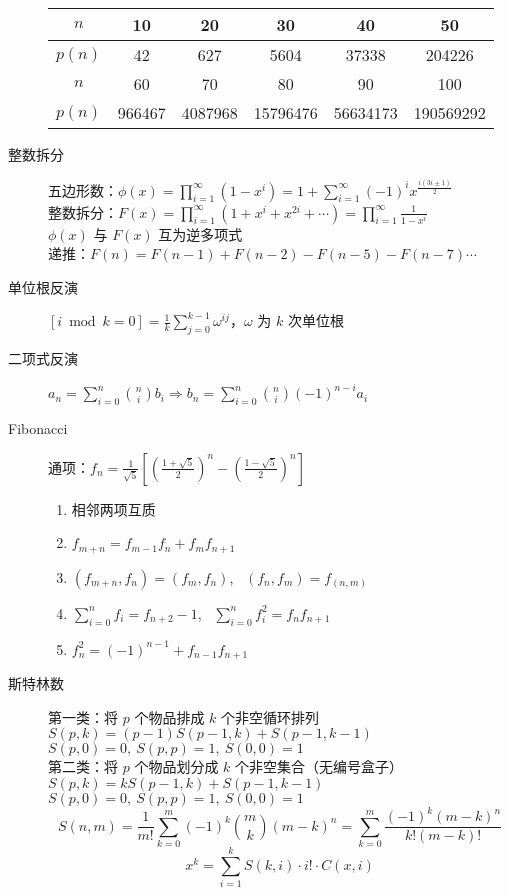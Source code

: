 \documentclass[6pt]{article}
\begin{document}
\begin{multicols}{2}
\begin{description}
          \begin{tabular}{@{}|c|ccccc|}
            \hline
            $n$    & 10     & 20      & 30       & 40       & 50        \\
            \hline
            $p(n)$ & 42     & 627     & 5604     & 37338    & 204226    \\
            \hline
            $n$    & 60     & 70      & 80       & 90       & 100       \\
            \hline
            $p(n)$ & 966467 & 4087968 & 15796476 & 56634173 & 190569292 \\
            \hline
          \end{tabular}
    \item[整数拆分] 五边形数：$\phi(x) = \prod_{i=1}^{\infty} (1-x^i) = 1+ \sum_{i=1}^{\infty} (-1)^i x^{\frac{i(3i\pm 1)}{2}}$ \\
          整数拆分：$F(x) = \prod_{i=1}^{\infty} (1+x^i+x^{2i}+ \cdots) = \prod_{i=1}^{\infty} \frac{1}{1-x^i}$ \\
          $\phi(x)$ 与 $F(x)$ 互为逆多项式 \\
          递推：$F(n) = F(n-1) + F(n-2) - F(n-5) - F(n-7) \cdots$
    \item[单位根反演] $[i \bmod k = 0] = \frac{1}{k} \sum_{j=0}^{k-1} \omega^{ij}$，$\omega$ 为 $k$ 次单位根
    \item[二项式反演] $a_n = \sum_{i=0}^n \binom{n}{i} b_i \Rightarrow b_n = \sum_{i=0}^n \binom{n}{i} (-1)^{n-i} a_i$
    \item[Fibonacci] 通项：$f_n = \frac{1}{\sqrt 5} \left[ \left(\frac{1+\sqrt 5}{2}\right)^n - \left(\frac{1-\sqrt 5}{2}\right)^n \right]$
          \begin{enumerate}
            \item 相邻两项互质
            \item $f_{m+n} = f_{m-1} f_n + f_m f_{n+1}$
            \item $(f_{m+n}, f_n) = (f_m, f_n)$, \ $(f_n, f_m) = f_{(n,m)}$
            \item $\sum_{i=0}^n f_i = f_{n+2} -1$, \ $\sum_{i=0}^n f_i^2 = f_n f_{n+1}$
            \item $f_n^2 = (-1)^{n-1} + f_{n-1} f_{n+1}$
          \end{enumerate}
    \item[斯特林数] 第一类：将 $p$ 个物品排成 $k$ 个非空循环排列 \\
          $S(p,k) = (p-1)S(p-1,k) + S(p-1,k-1)$ \\
          $S(p,0) = 0, \ S(p,p) = 1, \ S(0,0) = 1$ \\
          第二类：将 $p$ 个物品划分成 $k$ 个非空集合（无编号盒子） \\
          $S(p,k) = kS(p-1,k) + S(p-1,k-1)$ \\
          $S(p,0) = 0,\ S(p,p) = 1,\ S(0,0) = 1$ \\
          $$
            S(n,m) = \frac{1}{m!} \sum_{k=0}^m (-1)^k \binom{m}{k} (m-k)^n = \sum_{k=0}^m \frac{(-1)^k (m-k)^n}{k!(m-k)!}
          $$
          $$
            x^k=\sum_{i=1}^k S(k,i)\cdot i! \cdot C(x,i)
          $$


\end{description}
\end{multicols}
\end{document}
